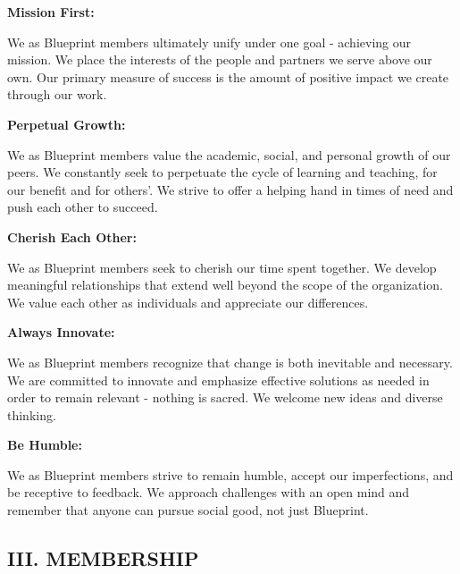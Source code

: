 \documentclass[
]{article}
\begin{document}
\textbf{Mission First:}

We as Blueprint members ultimately unify under one goal - achieving our
mission. We place the interests of the people and partners we serve
above our own. Our primary measure of success is the amount of positive
impact we create through our work.

\textbf{Perpetual Growth:}

We as Blueprint members value the academic, social, and personal growth
of our peers. We constantly seek to perpetuate the cycle of learning and
teaching, for our benefit and for others'. We strive to offer a helping
hand in times of need and push each other to succeed.

\textbf{Cherish Each Other:}

We as Blueprint members seek to cherish our time spent together. We
develop meaningful relationships that extend well beyond the scope of
the organization. We value each other as individuals and appreciate our
differences.

\textbf{Always Innovate:}

We as Blueprint members recognize that change is both inevitable and
necessary. We are committed to innovate and emphasize effective
solutions as needed in order to remain relevant - nothing is sacred. We
welcome new ideas and diverse thinking.

\textbf{Be Humble:}

We as Blueprint members strive to remain humble, accept our
imperfections, and be receptive to feedback. We approach challenges with
an open mind and remember that anyone can pursue social good, not just
Blueprint.

\hypertarget{iii.-membership}{%
\subsection{III. MEMBERSHIP}\label{iii.-membership}}
\end{document}
